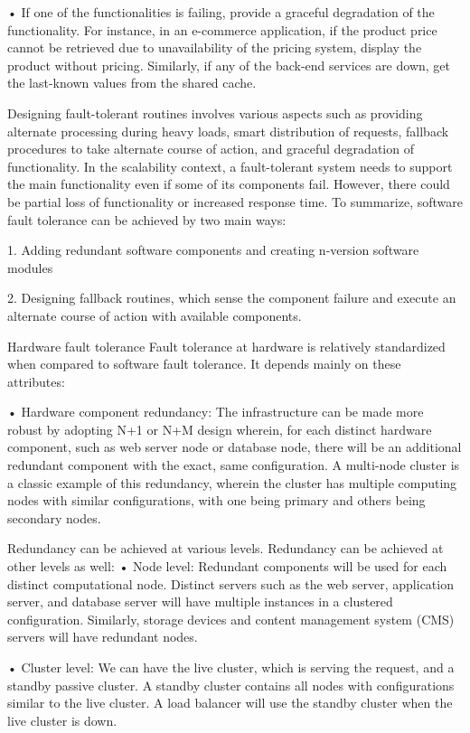 • If one of the functionalities is failing, provide a graceful degradation of the functionality. For instance, in an e-commerce application, if the product price cannot be retrieved due to unavailability of the pricing system, display the product without pricing. Similarly, if any of the back-end services are down, get the last-known values from the shared cache.

Designing fault-tolerant routines involves various aspects such as providing alternate processing during heavy loads, smart distribution of requests, fallback procedures to take alternate course of action, and graceful degradation of functionality. In the scalability context, a fault-tolerant system needs to support the main functionality even if some of its components fail. However, there could be partial loss of functionality or increased response time. To summarize, software fault tolerance can be achieved by two main ways:

1.
Adding redundant software components and creating n-version software modules

2.
Designing fallback routines, which sense the component failure and execute an alternate course of action with available components.

Hardware fault tolerance
Fault tolerance at hardware is relatively standardized when compared to software fault tolerance. It depends mainly on these attributes:

• Hardware component redundancy: The infrastructure can be made more robust by adopting N+1 or N+M design wherein, for each distinct hardware component, such as web server node or database node, there will be an additional redundant component with the exact, same configuration. A multi-node cluster is a classic example of this redundancy, wherein the cluster has multiple computing nodes with similar configurations, with one being primary and others being secondary nodes.

Redundancy can be achieved at various levels. Redundancy can be achieved at other levels as well:
• Node level: Redundant components will be used for each distinct computational node. Distinct servers such as the web server, application server, and database server will have multiple instances in a clustered configuration. Similarly, storage devices and content management system (CMS) servers will have redundant nodes.

• Cluster level: We can have the live cluster, which is serving the request, and a standby passive cluster. A standby cluster contains all nodes with configurations similar to the live cluster. A load balancer will use the standby cluster when the live cluster is down.

